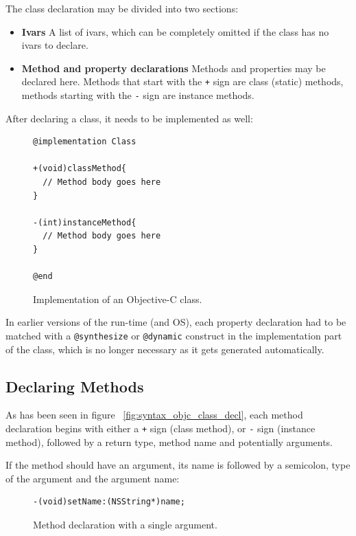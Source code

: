 The class declaration may be divided into two sections:

\begin{itemize}
  \item{\bf{Ivars}} A list of ivars, which can be completely omitted if the class has no ivars to declare.
  \item{\bf{Method and property declarations}} Methods and properties may be declared here. Methods that start with the \verb=+= sign are class (static) methods, methods starting with the \verb=-= sign are instance methods.
\end{itemize}

After declaring a class, it needs to be implemented as well:

\begin{figure}[H]
  \begin{verbatim}
@implementation Class

+(void)classMethod{
  // Method body goes here
}

-(int)instanceMethod{
  // Method body goes here
}

@end
  \end{verbatim}
  \centering{}
  \caption{Implementation of an Objective-C class.}
  \label{fig:syntax_objc_class_impl}
\end{figure}

In earlier versions of the run-time (and OS), each property declaration had to be matched with a \verb=@synthesize= or \verb=@dynamic= construct in the implementation part of the class, which is no longer necessary as it gets generated automatically.

\subsection{Declaring Methods}

As has been seen in figure ~\ref{fig:syntax_objc_class_decl}, each method declaration begins with either a \verb=+= sign (class method), or \verb=-= sign (instance method), followed by a return type, method name and potentially arguments.

If the method should have an argument, its name is followed by a semicolon, type of the argument and the argument name:

\begin{figure}[H]
  \begin{verbatim}
-(void)setName:(NSString*)name;
  \end{verbatim}
  \centering{}
  \caption{Method declaration with a single argument.}
  \label{fig:syntax_objc_single_arg}
\end{figure}

